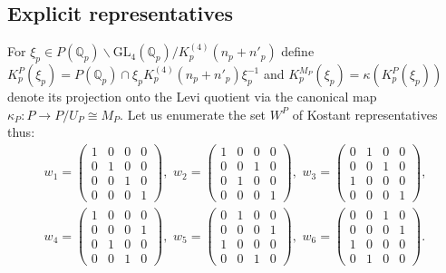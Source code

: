 \documentclass[11pt]{amsart}
\newcommand{\GL}{\mathrm{GL}}
\newcommand{\mirp}[1]{K_p^{(4)}(#1)}
\begin{document}
\subsection{Explicit representatives}
\hfill

For $\xi_p \in P(\mathbb{Q}_p) \backslash \GL_4(\mathbb{Q}_p) / \mirp{n_p + n'_p}$ 
define  $K_p^P(\xi_p) = P(\mathbb{Q}_p) \cap \xi_p \mirp{n_p + n'_p} \xi_p^{-1}$ and 
$K_p^{M_P}(\xi_p) = \kappa(K_p^P(\xi_p))$ denote its projection onto the Levi quotient via the canonical map $\kappa_P: P \rightarrow P/U_P \cong M_P.$ 
Let us enumerate the set $W^P$ of Kostant representatives thus:
\begin{multline*} w_1=
	\left(\begin{smallmatrix}
		1 & 0 & 0 & 0 \\
		0 & 1 & 0 & 0 \\
		0 & 0 & 1 & 0 \\
		0 & 0 & 0 & 1
	\end{smallmatrix}\right), \,\, w_2= 
	\left(\begin{smallmatrix}
		1 & 0 & 0 & 0 \\
		0 & 0 & 1 & 0 \\
		0 & 1 & 0 & 0 \\
		0 & 0 & 0 & 1
	\end{smallmatrix}\right), \,\, w_3 =
	\left(\begin{smallmatrix}
		0 & 1 & 0 & 0 \\
		0 & 0 & 1 & 0 \\
		1 & 0 & 0 & 0 \\
		0 & 0 & 0 & 1
	\end{smallmatrix}\right), \\ w_4 = 
	\left(\begin{smallmatrix}
		1 & 0 & 0 & 0 \\
		0 & 0 & 0 & 1 \\
		0 & 1 & 0 & 0 \\
		0 & 0 & 1 & 0
	\end{smallmatrix}\right), \,\, w_5 = 
	\left(\begin{smallmatrix}
		0 & 1 & 0 & 0 \\
		0 & 0 & 0 & 1 \\
		1 & 0 & 0 & 0 \\
		0 & 0 & 1 & 0
	\end{smallmatrix}\right), \,\, w_6 = 
	\left(\begin{smallmatrix}
		0 & 0 & 1 & 0 \\
		0 & 0 & 0 & 1 \\
		1 & 0 & 0 & 0 \\
		0 & 1 & 0 & 0
	\end{smallmatrix}\right). \end{multline*}
\end{document}
